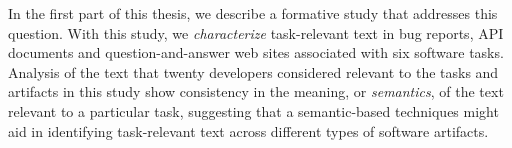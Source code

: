 
In the first part of this thesis, we describe 
a formative study that addresses this question. 
With this study, we \textit{characterize} task-relevant text in bug
reports, API documents and question-and-answer web sites associated with six software tasks. 
Analysis of the text that twenty developers considered relevant to the tasks and artifacts 
in this study show consistency in the meaning, or \textit{semantics}, of the
text relevant to a particular task, suggesting that a 
semantic-based techniques might aid in identifying
task-relevant text across different types of software artifacts.















